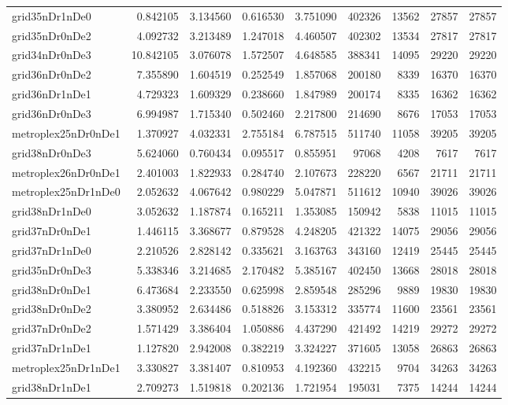 \documentclass[../../../thesis.tex]{subfiles}
\begin{document}
\begin{longtable}{|l|r|r|r|r|r|r|r|r|}
grid35nDr1nDe0 & 0.842105 & 3.134560 & 0.616530 & 3.751090 & 402326 & 13562 & 27857 & 27857 \\
grid35nDr0nDe2 & 4.092732 & 3.213489 & 1.247018 & 4.460507 & 402302 & 13534 & 27817 & 27817 \\
grid34nDr0nDe3 & 10.842105 & 3.076078 & 1.572507 & 4.648585 & 388341 & 14095 & 29220 & 29220 \\
grid36nDr0nDe2 & 7.355890 & 1.604519 & 0.252549 & 1.857068 & 200180 & 8339 & 16370 & 16370 \\
grid36nDr1nDe1 & 4.729323 & 1.609329 & 0.238660 & 1.847989 & 200174 & 8335 & 16362 & 16362 \\
grid36nDr0nDe3 & 6.994987 & 1.715340 & 0.502460 & 2.217800 & 214690 & 8676 & 17053 & 17053 \\
metroplex25nDr0nDe1 & 1.370927 & 4.032331 & 2.755184 & 6.787515 & 511740 & 11058 & 39205 & 39205 \\
grid38nDr0nDe3 & 5.624060 & 0.760434 & 0.095517 & 0.855951 & 97068 & 4208 & 7617 & 7617 \\
metroplex26nDr0nDe1 & 2.401003 & 1.822933 & 0.284740 & 2.107673 & 228220 & 6567 & 21711 & 21711 \\
metroplex25nDr1nDe0 & 2.052632 & 4.067642 & 0.980229 & 5.047871 & 511612 & 10940 & 39026 & 39026 \\
grid38nDr1nDe0 & 3.052632 & 1.187874 & 0.165211 & 1.353085 & 150942 & 5838 & 11015 & 11015 \\
grid37nDr0nDe1 & 1.446115 & 3.368677 & 0.879528 & 4.248205 & 421322 & 14075 & 29056 & 29056 \\
grid37nDr1nDe0 & 2.210526 & 2.828142 & 0.335621 & 3.163763 & 343160 & 12419 & 25445 & 25445 \\
grid35nDr0nDe3 & 5.338346 & 3.214685 & 2.170482 & 5.385167 & 402450 & 13668 & 28018 & 28018 \\
grid38nDr0nDe1 & 6.473684 & 2.233550 & 0.625998 & 2.859548 & 285296 & 9889 & 19830 & 19830 \\
grid38nDr0nDe2 & 3.380952 & 2.634486 & 0.518826 & 3.153312 & 335774 & 11600 & 23561 & 23561 \\
grid37nDr0nDe2 & 1.571429 & 3.386404 & 1.050886 & 4.437290 & 421492 & 14219 & 29272 & 29272 \\
grid37nDr1nDe1 & 1.127820 & 2.942008 & 0.382219 & 3.324227 & 371605 & 13058 & 26863 & 26863 \\
metroplex25nDr1nDe1 & 3.330827 & 3.381407 & 0.810953 & 4.192360 & 432215 & 9704 & 34263 & 34263 \\
grid38nDr1nDe1 & 2.709273 & 1.519818 & 0.202136 & 1.721954 & 195031 & 7375 & 14244 & 14244 \\

\end{longtable}
\end{document}
